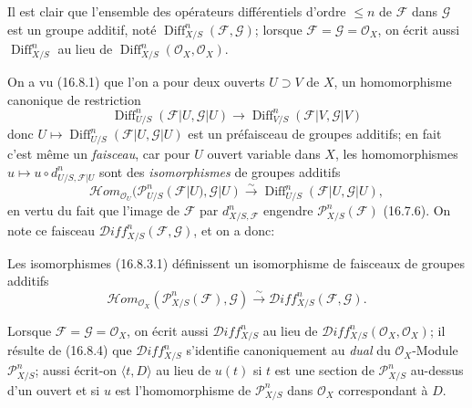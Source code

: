 \begin{env}[16.8.3]
\label{IV.16.8.3}
Il est clair que l'ensemble des opérateurs différentiels d'ordre $\leq n$ de
$\mathscr{F}$ dans $\mathscr{G}$ est un groupe additif, noté
$\operatorname{Diff}_{X/S}^n(\mathscr{F},\mathscr{G})$; lorsque
$\mathscr{F}=\mathscr{G}=\mathcal{O}_X$, on écrit aussi
$\operatorname{Diff}_{X/S}^n$ au lieu de
$\operatorname{Diff}_{X/S}^n(\mathcal{O}_X,\mathcal{O}_X)$.

On a vu (16.8.1) que l'on a pour deux ouverts $U\supset V$ de $X$, un
homomorphisme canonique de restriction
\[
  \operatorname{Diff}_{U/S}^n(\mathscr{F}|U,\mathscr{G}|U)
  \longrightarrow
  \operatorname{Diff}_{V/S}^n(\mathscr{F}|V,\mathscr{G}|V)
\]
donc $U\mapsto\operatorname{Diff}_{U/S}^n(\mathscr{F}|U,\mathscr{G}|U)$ est
un préfaisceau de groupes additifs; en fait c'est même un \emph{faisceau}, car
pour $U$ ouvert variable dans $X$, les homomorphismes
$u\mapsto u\circ d_{U/S,\mathscr{F}|U}^n$ sont des \emph{isomorphismes} de
groupes additifs
\[
  \mathscr{H}\!om_{\mathcal{O}_U}
  (\mathscr{P}_{U/S}^n(\mathscr{F}|U),\mathscr{G}|U)
  \xrightarrow{\sim}
  \operatorname{Diff}_{U/S}^n(\mathscr{F}|U,\mathscr{G}|U),
  \tag{16.8.3.1}
  \label{IV.16.8.3.1}
\]
en vertu du fait que l'image de $\mathscr{F}$ par
$d_{X/S,\mathscr{F}}^n$ engendre $\mathscr{P}_{X/S}^n(\mathscr{F})$
(16.7.6). On note ce faisceau
$\mathscr{D}\!iff_{X/S}^n(\mathscr{F},\mathscr{G})$, et on a donc:
\end{env}

\begin{proposition}[16.8.4]
\label{IV.16.8.4}
Les isomorphismes (16.8.3.1) définissent un isomorphisme de faisceaux de
groupes additifs
\[
  \mathscr{H}\!om_{\mathcal{O}_X}
  (\mathscr{P}_{X/S}^n(\mathscr{F}),\mathscr{G})
  \xrightarrow{\sim}
  \mathscr{D}\!iff_{X/S}^n(\mathscr{F},\mathscr{G}).
  \tag{16.8.4.1}
  \label{IV.16.8.4.1}
\]
\end{proposition}

Lorsque $\mathscr{F}=\mathscr{G}=\mathcal{O}_X$, on écrit aussi
$\mathscr{D}\!iff_{X/S}^n$ au lieu de
$\mathscr{D}\!iff_{X/S}^n(\mathcal{O}_X,\mathcal{O}_X)$; il résulte de
(16.8.4) que $\mathscr{D}\!iff_{X/S}^n$ s'identifie canoniquement au
\emph{dual} du $\mathcal{O}_X$-Module $\mathscr{P}_{X/S}^n$; aussi écrit-on
$\langle t,D\rangle$ au lieu de $u(t)$ si $t$ est une section de
$\mathscr{P}_{X/S}^n$ au-dessus d'un ouvert et si $u$ est l'homomorphisme de
$\mathscr{P}_{X/S}^n$ dans $\mathcal{O}_X$ correspondant à $D$.

